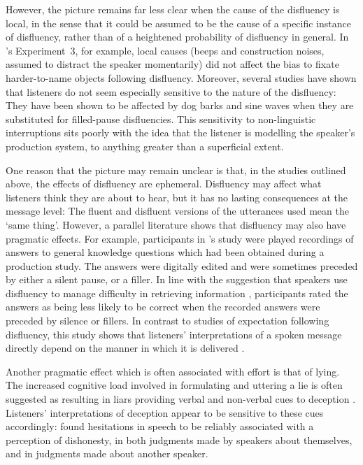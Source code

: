 \documentclass[a4paper,man,natbib]{apa6}
\newcommand*{\citegen}[1]{\citeauthor{#1}'s \citeyear{#1}}
\begin{document}
However, the picture remains far less clear when the cause of the disfluency is local, in the sense that it could be assumed to be the cause of a specific instance of disfluency, rather than of a heightened probability of disfluency in general.
In \citeauthor{Arnold2007}'s Experiment~3, for example, local causes (beeps and construction noises, assumed to distract the speaker momentarily) did not affect the bias to fixate harder-to-name objects following disfluency.
Moreover, several studies have shown that listeners do not seem especially sensitive to the nature of the disfluency:  They have been shown to be affected by dog barks \citep{bailey2003disfluencies} and sine waves \citep{corley2011helps} when they are substituted for filled-pause disfluencies.
This sensitivity to non-linguistic interruptions sits poorly with the idea that the listener is modelling the speaker's production system, to anything greater than a superficial extent.

One reason that the picture may remain unclear is that, in the studies outlined above, the effects of disfluency are ephemeral.
Disfluency may affect what listeners think they are about to hear, but it has no lasting consequences at the message level:  The fluent and disfluent versions of the utterances used mean the `same thing'.
However, a parallel literature shows that disfluency may also have pragmatic effects.
%
For example, participants in \citegen{Brennan1995} study were played recordings of answers to general knowledge questions which had been obtained during a production study.
The answers were digitally edited and were sometimes preceded by either a silent pause, or a filler.
In line with the suggestion that speakers use disfluency to manage difficulty in retrieving information \citep{Smith1993}, participants rated the answers as being less likely to be correct when the recorded answers were preceded by silence or fillers.
In contrast to studies of expectation following disfluency, this study shows that listeners' interpretations of a spoken message directly depend on the manner in which it is delivered \citep[see also][]{Swerts2005}.


Another pragmatic effect which is often associated with effort is that of lying.
The increased cognitive load involved in formulating and uttering a lie is often suggested as resulting in liars providing verbal and non-verbal cues to deception \citep{Zuckerman1981,depaulo2003cues}.
Listeners' interpretations of deception appear to be sensitive to these cues accordingly: \citeauthor{Zuckerman1981} found hesitations in speech to be reliably associated with a perception of dishonesty, in both judgments made by speakers about themselves, and in judgments made about another speaker.
\end{document}
